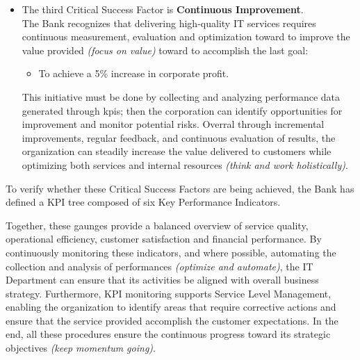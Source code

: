\begin{itemize}
    
    \item The third Critical Success Factor is \textbf{Continuous Improvement}. \\
    The Bank recognizes that delivering high-quality IT services requires continuous measurement, evaluation and optimization toward to improve the value provided \textit{(focus on value)} toward to accomplish the last goal:
    \begin{itemize}
        \item To achieve a 5\% increase in corporate profit.
    \end{itemize}
    This initiative must be done by collecting and analyzing performance data generated through \gls{kpi}s; then the corporation can identify opportunities for improvement and monitor potential risks.
    Overral through incremental improvements, regular feedback, and continuous evaluation of results, the organization can steadily increase the value delivered to customers while optimizing both services and internal resources \textit{(think and work holistically)}.
\end{itemize}

To verify whether these Critical Success Factors are being achieved, the Bank has defined a KPI tree composed of six Key Performance Indicators.

Together, these gaunges provide a balanced overview of service quality, operational efficiency, customer satisfaction and financial performance.
By continuously monitoring these indicators, and where possible, automating the collection and analysis of performances \textit{(optimize and automate)}, the IT Department can ensure that its activities be aligned with overall business strategy.
Furthermore, KPI monitoring supports Service Level Management, enabling the organization to identify areas that require corrective actions and ensure that the service provided accomplish the customer expectations. In the end, all these procedures ensure the continuous progress toward its strategic objectives \textit{(keep momentum going)}.


